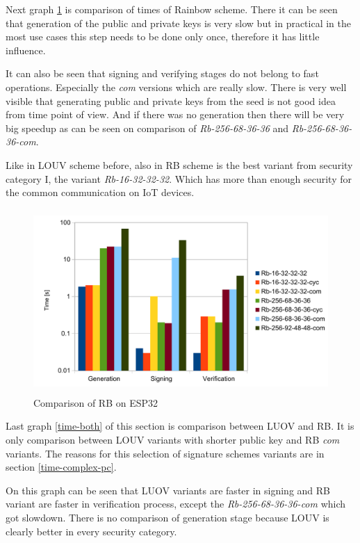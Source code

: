 \documentclass[thesis=M,english]{FITthesis}[2019/12/23]
\begin{document}
Next graph \ref{time-rb} is comparison of times of Rainbow scheme. There it can be seen that generation of the public and private keys is very slow but in practical in the most use cases this step needs to be done only once, therefore it has little influence.

\bigskip
\noindent
It can also be seen that signing and verifying stages do not belong to fast operations. Especially the \textit{com} versions which are really slow. There is very well visible that generating public and private keys from the seed is not good idea from time point of view. And if there was no generation then there will be very big speedup as can be seen on comparison of \textit{Rb-256-68-36-36} and \textit{Rb-256-68-36-36-com}.

\bigskip
\noindent
Like in LOUV scheme before, also in RB scheme is the best variant from security category I, the variant \textit{Rb-16-32-32-32}. Which has more than enough security for the common communication on IoT devices.

\begin{figure}[H]
\centering
\includegraphics[width=13cm,height=7cm]{images/time-rb.pdf}
\caption{Comparison of RB on ESP32}
\label{time-rb}
\end{figure}

\noindent
Last graph \ref{time-both} of this section is comparison between LUOV and RB. It is only comparison between LOUV variants with shorter public key and RB \textit{com} variants. The reasons for this selection of signature schemes variants are in section \ref{time-complex-pc}.

\bigskip
\noindent
On this graph can be seen that LUOV variants are faster in signing and RB variant are faster in verification process, except the \textit{Rb-256-68-36-36-com} which got slowdown. There is no comparison of generation stage because LOUV is clearly better in every security category.
\end{document}

